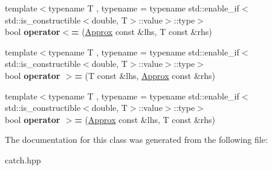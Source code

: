 \begin{DoxyCompactItemize}
\item 
\mbox{\label{classCatch_1_1Detail_1_1Approx_a6040b908588745570847d7ae8483b091}} 
{\footnotesize template$<$typename T , typename  = typename std\+::enable\+\_\+if$<$std\+::is\+\_\+constructible$<$double, T$>$\+::value$>$\+::type$>$ }\\bool {\bfseries operator$<$=} (\mbox{\hyperlink{classCatch_1_1Detail_1_1Approx}{Approx}} const \&lhs, T const \&rhs)
\item 
\mbox{\label{classCatch_1_1Detail_1_1Approx_ae68a144dad95cfe31786d2df0b25bb02}} 
{\footnotesize template$<$typename T , typename  = typename std\+::enable\+\_\+if$<$std\+::is\+\_\+constructible$<$double, T$>$\+::value$>$\+::type$>$ }\\bool {\bfseries operator $>$=} (T const \&lhs, \mbox{\hyperlink{classCatch_1_1Detail_1_1Approx}{Approx}} const \&rhs)
\item 
\mbox{\label{classCatch_1_1Detail_1_1Approx_aef8dca60ba535199c0703e1e3a25562b}} 
{\footnotesize template$<$typename T , typename  = typename std\+::enable\+\_\+if$<$std\+::is\+\_\+constructible$<$double, T$>$\+::value$>$\+::type$>$ }\\bool {\bfseries operator $>$=} (\mbox{\hyperlink{classCatch_1_1Detail_1_1Approx}{Approx}} const \&lhs, T const \&rhs)
\end{DoxyCompactItemize}


The documentation for this class was generated from the following file\+:\begin{DoxyCompactItemize}
\item 
catch.\+hpp\end{DoxyCompactItemize}
